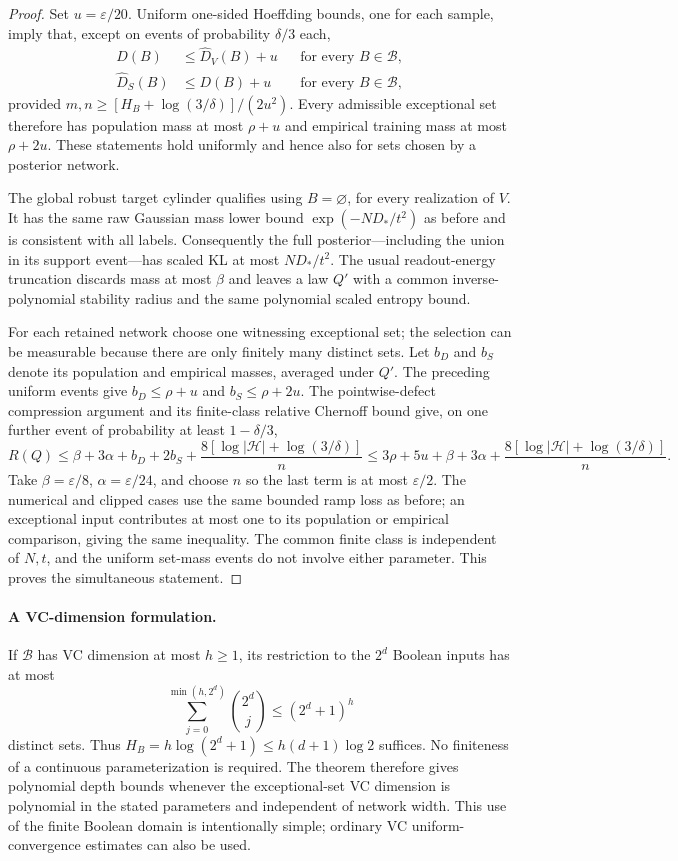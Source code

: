 \begin{proof}
Set $u=\varepsilon/20$. Uniform one-sided Hoeffding bounds, one for each
sample, imply that, except on events of probability $\delta/3$ each,
\begin{align*}
 D(B)&\le\widehat D_V(B)+u&&\text{for every }B\in\mathcal B,\\
 \widehat D_S(B)&\le D(B)+u&&\text{for every }B\in\mathcal B,
\end{align*}
provided $m,n\ge[H_B+\log(3/\delta)]/(2u^2)$.
Every admissible exceptional set therefore has population mass at most
$\rho+u$ and empirical training mass at most $\rho+2u$.
These statements hold uniformly and hence also for sets chosen by a
posterior network.

The global robust target cylinder qualifies using $B=\varnothing$, for
every realization of $V$. It has the same raw Gaussian mass lower bound
$\exp(-ND_*/t^2)$ as before and is consistent with all labels. Consequently
the full posterior---including the union in its support event---has
scaled KL at most $ND_*/t^2$. The usual readout-energy truncation discards
mass at most $\beta$ and leaves a law $Q'$ with a common inverse-polynomial
stability radius and the same polynomial scaled entropy bound.

For each retained network choose one witnessing exceptional set; the
selection can be measurable because there are only finitely many distinct
sets. Let $b_D$ and $b_S$ denote its population and empirical masses,
averaged under $Q'$. The preceding uniform events give
$b_D\le\rho+u$ and $b_S\le\rho+2u$.
The pointwise-defect compression argument and its finite-class relative
Chernoff bound give, on one further event of probability at least
$1-\delta/3$,
\[
 R(Q)\le\beta+3\alpha+b_D+2b_S+
       \frac{8[\log|\mathcal H|+\log(3/\delta)]}{n}
 \le3\rho+5u+\beta+3\alpha+
       \frac{8[\log|\mathcal H|+\log(3/\delta)]}{n}.
\]
Take $\beta=\varepsilon/8$, $\alpha=\varepsilon/24$, and choose $n$ so
the last term is at most $\varepsilon/2$. The numerical and clipped cases
use the same bounded ramp loss as before; an exceptional input contributes
at most one to its population or empirical comparison, giving the same
inequality. The common finite class is independent of $N,t$, and the
uniform set-mass events do not involve either parameter. This proves the
simultaneous statement.
\end{proof}

\paragraph{A VC-dimension formulation.}
If $\mathcal B$ has VC dimension at most $h\ge1$, its restriction to the
$2^d$ Boolean inputs has at most
\[
 \sum_{j=0}^{\min(h,2^d)}\binom{2^d}{j}
 \le(2^d+1)^h
\]
distinct sets. Thus $H_B=h\log(2^d+1)\le h(d+1)\log2$ suffices.
No finiteness of a continuous parameterization is required. The theorem
therefore gives polynomial depth bounds whenever the exceptional-set VC
dimension is polynomial in the stated parameters and independent of
network width. This use of the finite Boolean domain is intentionally
simple; ordinary VC uniform-convergence estimates can also be used.

